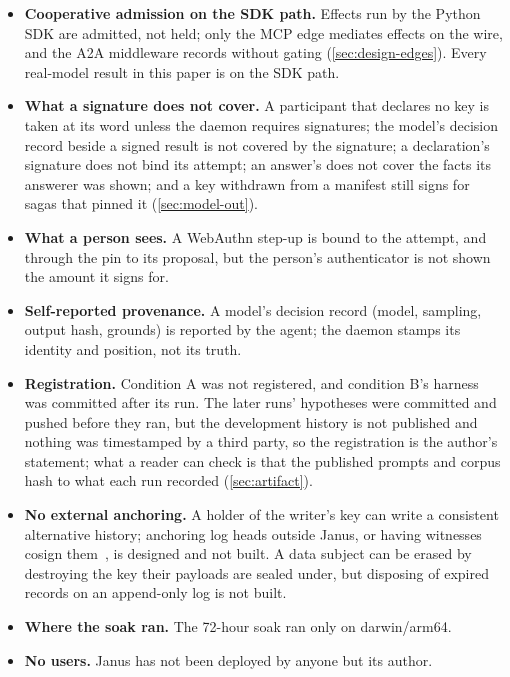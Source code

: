 \begin{itemize}
  that misreads or is steered into declaring a smaller amount passes them;
  Janus records the misreading and bounds its authority, and does not detect it.
\item \textbf{Cooperative admission on the SDK path.} Effects run by the Python
  SDK are admitted, not held; only the MCP edge mediates effects on the wire, and
  the A2A middleware records without gating (\cref{sec:design-edges}). Every
  real-model result in this paper is on the SDK path.
\item \textbf{What a signature does not cover.} A participant that declares no
  key is taken at its word unless the daemon requires signatures; the model's
  decision record beside a signed result is not covered by the signature; a
  declaration's signature does not bind its attempt; an answer's does not cover
  the facts its answerer was shown; and a key withdrawn from a manifest still
  signs for sagas that pinned it (\cref{sec:model-out}).
\item \textbf{What a person sees.} A WebAuthn step-up is bound to the attempt,
  and through the pin to its proposal, but the person's authenticator is not
  shown the amount it signs for.
\item \textbf{Self-reported provenance.} A model's decision record (model,
  sampling, output hash, grounds) is reported by the agent; the daemon stamps
  its identity and position, not its truth.
\item \textbf{Registration.} Condition A was not registered, and condition B's
  harness was committed after its run. The later runs' hypotheses were committed
  and pushed before they ran, but the development history is not published and
  nothing was timestamped by a third party, so the registration is the author's
  statement; what a reader can check is that the published prompts and corpus
  hash to what each run recorded (\cref{sec:artifact}).
\item \textbf{No external anchoring.} A holder of the writer's key can write a
  consistent alternative history; anchoring log heads outside Janus, or having
  witnesses cosign them~\cite{cosi}, is designed and not built. A data subject can be erased by destroying the key their payloads
  are sealed under, but disposing of expired records on an append-only log is not
  built.
\item \textbf{Where the soak ran.} The 72-hour soak ran only on darwin/arm64.
\item \textbf{No users.} Janus has not been deployed by anyone but its author.
\end{itemize}

